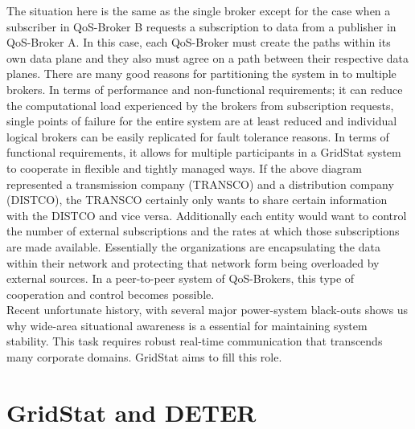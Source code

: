 \documentclass{article}
\begin{document}
The situation here is the same as the single broker except for the case when a 
subscriber in QoS-Broker B requests a subscription to data from a publisher in
 QoS-Broker A.  In this case, each QoS-Broker must create the paths within its own
 data plane and they also must agree on a path between their respective data planes. 
 There are many good reasons for partitioning the system in to multiple brokers. 
 In terms of performance and non-functional requirements; it can reduce the
 computational load experienced by the brokers from subscription requests, single points
 of failure for the entire system are at least reduced and individual logical brokers
 can be easily replicated for fault tolerance reasons.  In terms of functional 
requirements, it allows for multiple participants in a GridStat system to cooperate
 in flexible and tightly managed ways.  If the above diagram represented a transmission
 company (TRANSCO) and a distribution company (DISTCO), the TRANSCO certainly only wants
 to share certain information with the DISTCO and vice versa.  Additionally each entity 
would want to control the number of external subscriptions and the rates at which those
 subscriptions are made available.  Essentially the organizations are encapsulating the
 data within their network and protecting that network form being overloaded by external 
sources. In a peer-to-peer system of QoS-Brokers, this type of cooperation and control
 becomes possible. \\

Recent unfortunate history, with several major power-system black-outs shows us why
 wide-area situational awareness is a essential for maintaining system stability.  
This task requires robust real-time communication that transcends many corporate 
domains.  GridStat aims to fill this role.  


\section{GridStat and DETER}
\end{document}
